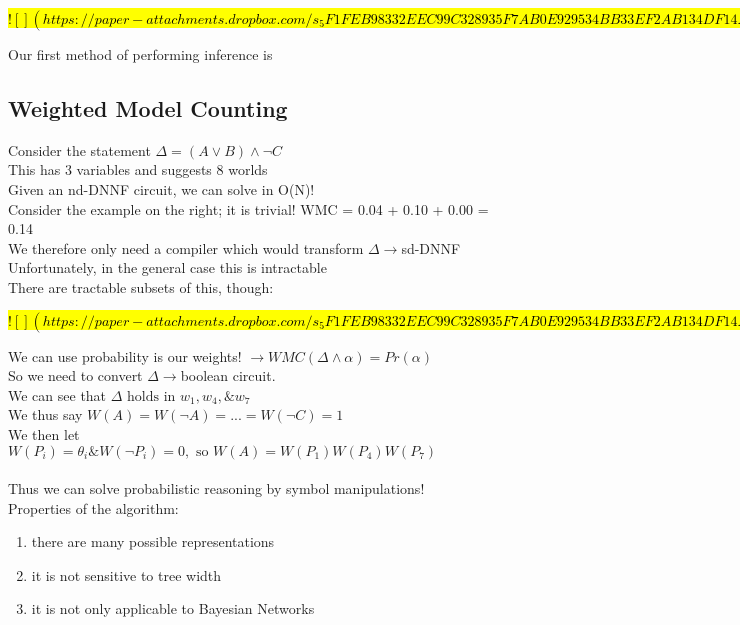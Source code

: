 \documentclass[../../lecture_notes.tex]{subfiles}
\begin{document}
\hl{
$![](https://paper-attachments.dropbox.com/s_5F1FEB98332EEC99C328935F7AB0E929534BB33EF2AB134DF14A85072ADC65A0_1590224552818_Untitled+drawing+6.jpg)$
}

\noindent Our first method of performing inference is
\subsection*{Weighted Model Counting}
\noindent Consider the statement $\Delta = (A \lor B) \land\neg C$\\ 
	\indent This has 3 variables and suggests 8 worlds\\
	\indent Given an nd-DNNF circuit, we can solve in O(N)!\\
	\indent Consider the example on the right; it is trivial! WMC = 0.04 + 0.10 + 0.00 = 0.14\\
	\indent We therefore only need a compiler which would transform $\Delta \rightarrow$sd-DNNF\\
	\indent Unfortunately, in the general case this is intractable\\
There are tractable subsets of this, though:

\hl{
$![](https://paper-attachments.dropbox.com/s_5F1FEB98332EEC99C328935F7AB0E929534BB33EF2AB134DF14A85072ADC65A0_1590225097526_Untitled+drawing+7.jpg)$
}

\noindent We can use probability is our weights! $ \rightarrow WMC(\Delta\land\alpha) = Pr(\alpha)$\\
So we need to convert $\Delta \rightarrow$boolean circuit.\\
We can see that $\Delta \text{ holds in } w_1, w_4, \& w_7$\\
We thus say $W(A) = W(\neg A) = ... = W(\neg C) = 1$\\
We then let $W(P_i) = \theta_i \& W(\neg P_i) = 0, \text{ so } W(A) = W(P_1) W(P_4) W(P_7)$\\
\\
Thus we can solve probabilistic reasoning by symbol manipulations!\\
Properties of the algorithm:
	\begin{enumerate} [itemsep=0mm]
		\item there are many possible representations
		\item it is not sensitive to tree width
		\item it is not only applicable to Bayesian Networks
	\end{enumerate} \medskip
\end{document}
